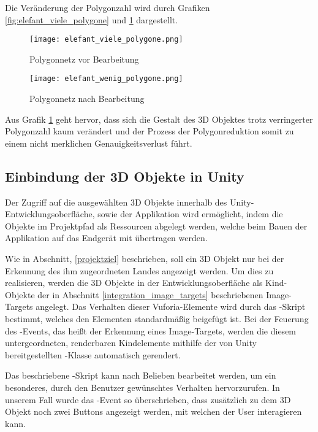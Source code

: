 Die Veränderung der Polygonzahl wird durch Grafiken \ref{fig:elefant_viele_polygone} und \ref{fig:elefant_wenig_polygone} dargestellt.

\begin{figure}[!htb]
  \texttt{[image: elefant\_viele\_polygone.png]}
  \caption{Polygonnetz vor Bearbeitung}\label{fig:elefant_viele_polygone}
\endminipage\hfill
{}
  \texttt{[image: elefant\_wenig\_polygone.png]}
  \caption{Polygonnetz nach Bearbeitung}\label{fig:elefant_wenig_polygone}
\endminipage\hfill
\end{figure}

Aus Grafik \ref{fig:elefant_wenig_polygone} geht hervor, dass sich die Gestalt des 3D Objektes trotz verringerter Polygonzahl kaum verändert und der Prozess der Polygonreduktion somit zu einem nicht merklichen Genauigkeitsverlust führt.
\subsection{Einbindung der 3D Objekte in Unity}
Der Zugriff auf die ausgewählten 3D Objekte innerhalb des Unity-Entwicklungsoberfläche, sowie der Applikation wird ermöglicht, indem die Objekte im Projektpfad als Ressourcen abgelegt werden, welche beim Bauen der Applikation auf das Endgerät mit übertragen werden. 

Wie in Abschnitt, \ref{projektziel} beschrieben, soll ein 3D Objekt nur bei der Erkennung des ihm zugeordneten Landes angezeigt werden.
Um dies zu realisieren, werden die 3D Objekte in der Entwicklungsoberfläche als Kind-Objekte der in Abschnitt \ref{integration_image_targets} beschriebenen Image-Targets angelegt.
Das Verhalten dieser Vuforia-Elemente wird durch das -Skript bestimmt, welches den Elementen standardmäßig beigefügt ist. 
Bei der Feuerung des -Events, das heißt der Erkennung eines Image-Targets, werden die diesem untergeordneten, renderbaren Kindelemente mithilfe der von Unity bereitgestellten -Klasse automatisch gerendert.

Das beschriebene -Skript kann nach Belieben bearbeitet werden, um ein besonderes, durch den Benutzer gewünschtes Verhalten hervorzurufen.
In unserem Fall wurde das -Event so überschrieben, dass zusätzlich zu dem 3D Objekt noch zwei Buttons angezeigt werden, mit welchen der User interagieren kann.

